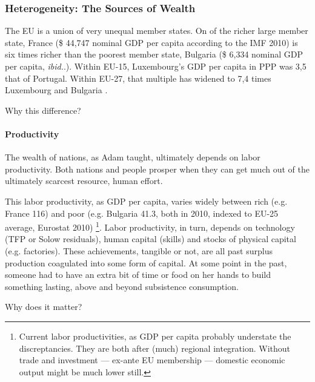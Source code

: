 \documentclass[11pt,a4paper,oneside,openright]{article}
\begin{document}
\subsubsection[Heterogeneity]{Heterogeneity: The Sources of Wealth} \label{sec:sources-of-wealth} The \gls{EU} is a union of very unequal member states. 
On of the richer large member state, France (\$ 44,747 nominal \gls{GDP} per capita according to the IMF 2010) is six times richer than the poorest member state, Bulgaria (\$ 6,334 nominal \gls{GDP} per capita, \emph{ibid.}.). 
Within \gls{EU}-15, Luxembourg's \gls{GDP} per capita in \gls{PPP} was 3,5 that of Portugal. 
Within \gls{EU}-27, that multiple has widened to 7,4 times Luxembourg and Bulgaria \citep[1]{Alber2008}. %

Why this difference?

\paragraph{Productivity} The wealth of nations, as Adam \cite{Smith-1776-lq} taught, ultimately depends on labor productivity. 
Both nations and people prosper when they can get much out of the ultimately scarcest resource, human effort. 

This labor productivity, as \gls{GDP} per capita, varies widely between rich (e.g. France 116) and poor (e.g. Bulgaria 41.3, both in 2010, indexed to EU-25 average, Eurostat 2010)
\footnote{
	Current labor productivities, as \gls{GDP} per capita probably understate the discreptancies. 
	They are both after (much) regional integration. 
	Without trade and investment --- ex-ante EU membership --- domestic economic output might be much lower still.
}. 
Labor productivity, in turn, depends on technology (\gls{TFP} or Solow residuals), human capital (skills) and stocks of physical capital (e.g. factories). 
These achievements, tangible or not, are all past surplus production coagulated into some form of capital. 
At some point in the past, someone had to have an extra bit of time or food on her hands to build something lasting, above and beyond subsistence consumption.

Why does it matter?
\end{document}
